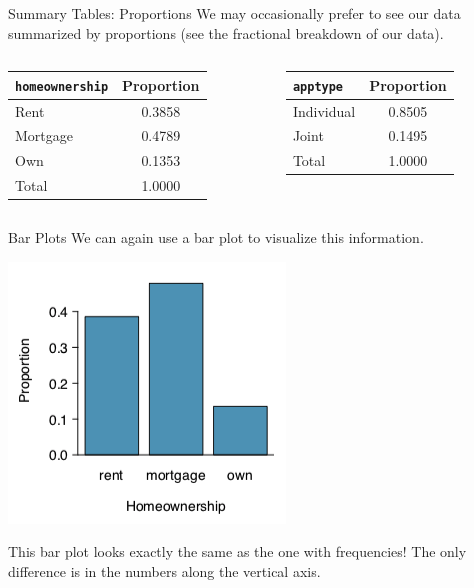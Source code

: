 \begin{frame}{Summary Tables: Proportions}
    We may occasionally prefer to see our data summarized by proportions (see the fractional breakdown of our data).
    
    \begin{columns}[T] %
        \begin{column}{.48\textwidth}
        \begin{center}
        \begin{tabular}{l c}
		    \texttt{homeownership} & Proportion \\ \hline
		    Rent & 0.3858 \\ 
		    Mortgage & 0.4789 \\
		    Own & 0.1353 \\ \hline
		    Total & 1.0000 \\ \hline
        \end{tabular}
        \end{center}
        \end{column}%
        \hfill%
        \begin{column}{.48\textwidth}
        \begin{center}
        \begin{tabular}{l c}
		    \texttt{apptype} & Proportion \\ \hline
		    Individual & 0.8505 \\ 
		    Joint & 0.1495 \\ \hline
		    Total & 1.0000 \\ \hline
        \end{tabular}
        \end{center}
        \end{column}%
    \end{columns}
\end{frame}

\begin{frame}{Bar Plots}
    We can again use a bar plot to visualize this information.
    \begin{center}
        \includegraphics[scale=0.5]{images/barplot_prop.png}
    \end{center}
    This bar plot looks exactly the same as the one with frequencies! The only difference is in the numbers along the vertical axis.
\end{frame}

